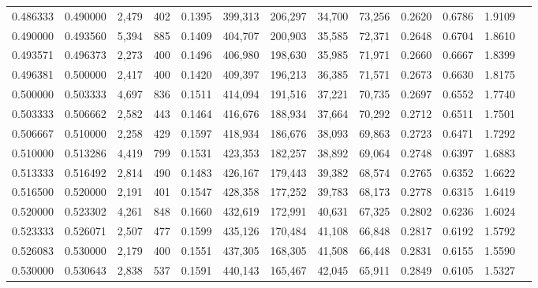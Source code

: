 \begin{tabular}{rrrrrrrrrrrrr}
0.486333 & 0.490000 &  2,479 &   402 &                                     0.1395 & 399,313 & 206,297 &  34,700 &  73,256 & 0.2620 & 0.6786 & 1.9109 \\
0.490000 & 0.493560 &  5,394 &   885 &                                     0.1409 & 404,707 & 200,903 &  35,585 &  72,371 & 0.2648 & 0.6704 & 1.8610 \\
0.493571 & 0.496373 &  2,273 &   400 &                                     0.1496 & 406,980 & 198,630 &  35,985 &  71,971 & 0.2660 & 0.6667 & 1.8399 \\
0.496381 & 0.500000 &  2,417 &   400 &                                     0.1420 & 409,397 & 196,213 &  36,385 &  71,571 & 0.2673 & 0.6630 & 1.8175 \\
0.500000 & 0.503333 &  4,697 &   836 &                                     0.1511 & 414,094 & 191,516 &  37,221 &  70,735 & 0.2697 & 0.6552 & 1.7740 \\
0.503333 & 0.506662 &  2,582 &   443 &                                     0.1464 & 416,676 & 188,934 &  37,664 &  70,292 & 0.2712 & 0.6511 & 1.7501 \\
0.506667 & 0.510000 &  2,258 &   429 &                                     0.1597 & 418,934 & 186,676 &  38,093 &  69,863 & 0.2723 & 0.6471 & 1.7292 \\
0.510000 & 0.513286 &  4,419 &   799 &                                     0.1531 & 423,353 & 182,257 &  38,892 &  69,064 & 0.2748 & 0.6397 & 1.6883 \\
0.513333 & 0.516492 &  2,814 &   490 &                                     0.1483 & 426,167 & 179,443 &  39,382 &  68,574 & 0.2765 & 0.6352 & 1.6622 \\
0.516500 & 0.520000 &  2,191 &   401 &                                     0.1547 & 428,358 & 177,252 &  39,783 &  68,173 & 0.2778 & 0.6315 & 1.6419 \\
0.520000 & 0.523302 &  4,261 &   848 &                                     0.1660 & 432,619 & 172,991 &  40,631 &  67,325 & 0.2802 & 0.6236 & 1.6024 \\
0.523333 & 0.526071 &  2,507 &   477 &                                     0.1599 & 435,126 & 170,484 &  41,108 &  66,848 & 0.2817 & 0.6192 & 1.5792 \\
0.526083 & 0.530000 &  2,179 &   400 &                                     0.1551 & 437,305 & 168,305 &  41,508 &  66,448 & 0.2831 & 0.6155 & 1.5590 \\
0.530000 & 0.530643 &  2,838 &   537 &                                     0.1591 & 440,143 & 165,467 &  42,045 &  65,911 & 0.2849 & 0.6105 & 1.5327 \\

\end{tabular}

